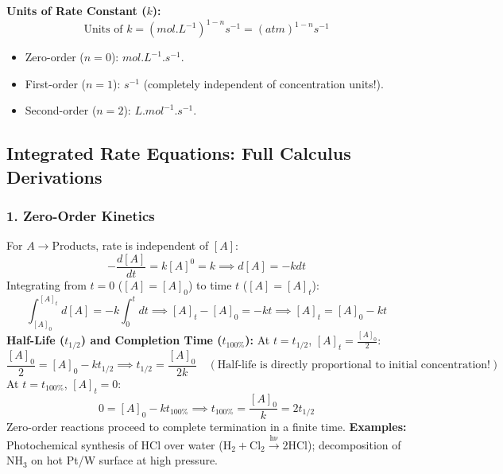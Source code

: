 \documentclass[10pt,a4paper]{article}
\begin{document}
\textbf{Units of Rate Constant ($k$):}
\begin{equation}
  \text{Units of } k = \left(\si{mol.L^{-1}}\right)^{1 - n} \si{s^{-1}} = \left(\si{atm}\right)^{1 - n} \si{s^{-1}}
\end{equation}
\begin{itemize}
  \item Zero-order ($n=0$): $\si{mol.L^{-1}.s^{-1}}$.
  \item First-order ($n=1$): $\si{s^{-1}}$ (completely independent of concentration units!).
  \item Second-order ($n=2$): $\si{L.mol^{-1}.s^{-1}}$.
\end{itemize}

\subsection{Integrated Rate Equations: Full Calculus Derivations}

\subsubsection{1. Zero-Order Kinetics}
For $A \to \text{Products}$, rate is independent of $[A]$:
\begin{equation}
  -\frac{d[A]}{dt} = k [A]^0 = k \implies d[A] = -k dt
\end{equation}
Integrating from $t = 0$ ($[A] = [A]_0$) to time $t$ ($[A] = [A]_t$):
\begin{equation}
  \int_{[A]_0}^{[A]_t} d[A] = -k \int_0^t dt \implies [A]_t - [A]_0 = -kt \implies [A]_t = [A]_0 - kt
\end{equation}
\textbf{Half-Life ($t_{1/2}$) and Completion Time ($t_{100\%}$):}
At $t = t_{1/2}$, $[A]_t = \frac{[A]_0}{2}$:
\begin{equation}
  \frac{[A]_0}{2} = [A]_0 - k t_{1/2} \implies t_{1/2} = \frac{[A]_0}{2k} \quad (\text{Half-life is directly proportional to initial concentration!})
\end{equation}
At $t = t_{100\%}$, $[A]_t = 0$:
\begin{equation}
  0 = [A]_0 - k t_{100\%} \implies t_{100\%} = \frac{[A]_0}{k} = 2 t_{1/2}
\end{equation}
Zero-order reactions proceed to complete termination in a finite time.
\textbf{Examples:} Photochemical synthesis of $\mathrm{HCl}$ over water ($\mathrm{H_2 + Cl_2 \xrightarrow{h\nu} 2HCl}$); decomposition of $\mathrm{NH_3}$ on hot Pt/W surface at high pressure.
\end{document}
